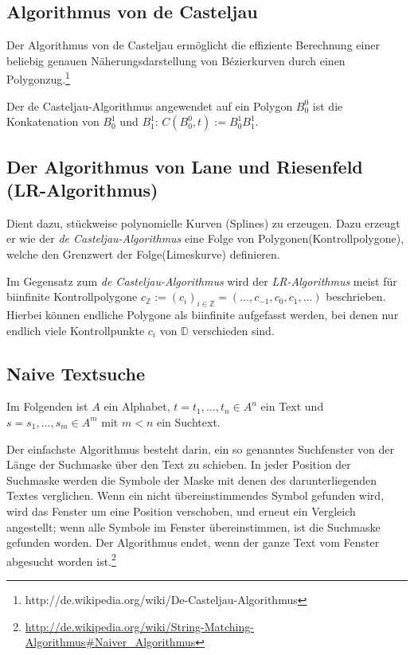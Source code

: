 \subsection{Algorithmus von de Casteljau}
Der Algorithmus von de Casteljau ermöglicht die effiziente Berechnung einer beliebig genauen Näherungsdarstellung von Bézierkurven durch einen Polygonzug.\footnote{http://de.wikipedia.org/wiki/De-Casteljau-Algorithmus}

Der de Casteljau-Algorithmus angewendet auf ein Polygon \(B_0^0\) ist die Konkatenation von \(B_0^1\) und \(B_1^1\): \(C(B_0^0,t) := B_0^1 B_1^1\).
\text{}\\



\subsection{Der Algorithmus von Lane und Riesenfeld (LR-Algorithmus)}
Dient dazu, stückweise polynomielle Kurven (Splines) zu erzeugen. Dazu erzeugt er wie der \textit{de Casteljau-Algorithmus} eine Folge von Polygonen(Kontrollpolygone), welche den Grenzwert der Folge(Limeskurve) definieren.

Im Gegensatz zum \textit{de Casteljau-Algorithmus} wird der \textit{LR-Algorithmus} meist für biinfinite Kontrollpolygone \(c_\mathbb{Z} := (c_i)_{i \in \mathbb{Z}} = (...,c_{-1},c_0,c_1,...)\) beschrieben. Hierbei können endliche Polygone als biinfinite aufgefasst werden, bei denen nur endlich viele Kontrollpunkte \(c_i\) von \(\mathbb{D}\) verschieden sind.
\text{}\\



\subsection{Naive Textsuche}
Im Folgenden ist \(A\) ein Alphabet, \(t = t_1,...,t_n \in A^n\) ein Text und \(s = s_1,...,s_m \in A^m\) mit \(m<n\) ein Suchtext.

Der einfachste Algorithmus besteht darin, ein so genanntes Suchfenster von der Länge der Suchmaske über den Text zu schieben. In jeder Position der Suchmaske werden die Symbole der Maske mit denen des darunterliegenden Textes verglichen. Wenn ein nicht übereinstimmendes Symbol gefunden wird, wird das Fenster um eine Position verschoben, und erneut ein Vergleich angestellt; wenn alle Symbole im Fenster übereinstimmen, ist die Suchmaske gefunden worden. Der Algorithmus endet, wenn der ganze Text vom Fenster abgesucht worden ist.\footnote{\url{http://de.wikipedia.org/wiki/String-Matching-Algorithmus\#Naiver_Algorithmus}}
\text{}\\


